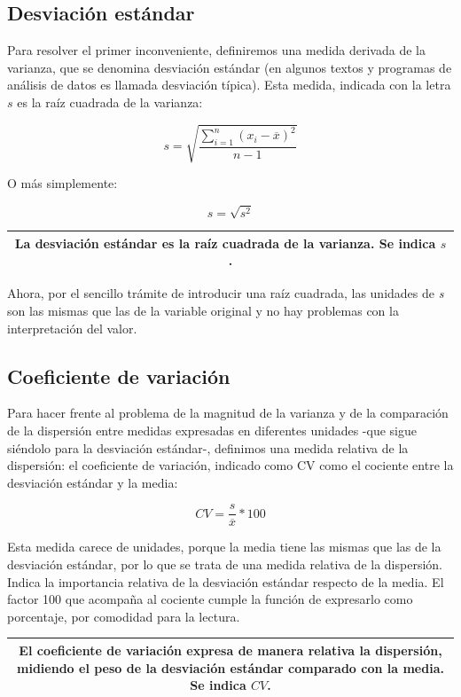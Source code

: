 \documentclass[]{book}
\begin{document}
\hypertarget{desviacion-estandar}{%
\subsection{Desviación estándar}\label{desviacion-estandar}}

Para resolver el primer inconveniente, definiremos una medida derivada de la varianza, que se denomina desviación estándar (en algunos textos y programas de análisis de datos es llamada desviación típica). Esta medida, indicada con la letra \(s\) es la raíz cuadrada de la varianza:

\[s = \sqrt{\frac{\sum_{i = 1}^{n}\left( x_{i} - \overline{x} \right)^{2}}{n - 1}}\]

O más simplemente:

\[s = \sqrt{s^{2}}\]

\begin{longtable}[]{@{}c@{}}
\toprule
\endhead
La \textbf{desviación estándar} es la raíz cuadrada de la varianza. Se indica \(s\).\tabularnewline
\bottomrule
\end{longtable}

Ahora, por el sencillo trámite de introducir una raíz cuadrada, las
unidades de \emph{s} son las mismas que las de la variable original y no hay problemas con la interpretación del valor.

\hypertarget{coeficiente-de-variacion}{%
\subsection{Coeficiente de variación}\label{coeficiente-de-variacion}}

Para hacer frente al problema de la magnitud de la varianza y de la comparación de la dispersión entre medidas expresadas en diferentes unidades -que sigue siéndolo para la desviación estándar-, definimos una medida relativa de la dispersión: el coeficiente de variación, indicado como CV como el cociente entre la desviación estándar y la media:

\[CV=\frac{s}{\overline{x}}*100\]

Esta medida carece de unidades, porque la media tiene las mismas que las de la desviación estándar, por lo que se trata de una medida relativa de la dispersión. Indica la importancia relativa de la desviación estándar respecto de la media. El factor 100 que acompaña al cociente cumple la función de expresarlo como porcentaje, por comodidad para la lectura.

\begin{longtable}[]{@{}c@{}}
\toprule
\endhead
\begin{minipage}[t]{0.97\columnwidth}\centering
El \textbf{coeficiente de variación} expresa de manera relativa la dispersión, midiendo el peso de la desviación estándar comparado con la media. Se indica \(CV\).\strut
\end{minipage}\tabularnewline
\bottomrule
\end{longtable}
\end{document}
